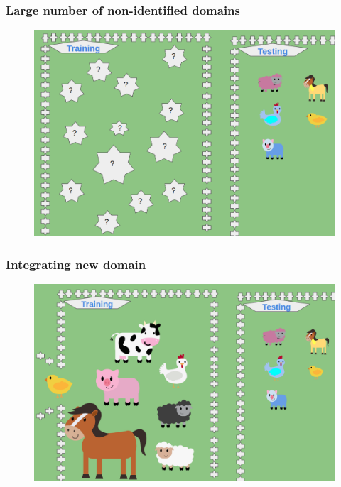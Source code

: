 \documentclass{beamer}
\begin{document}
\begin{frame}
\frametitle{Large number of non-identified domains}
\begin{figure}
\includegraphics[width=\textwidth]{cluster_question.png}
\end{figure}
\end{frame}

\begin{frame}
\frametitle{Integrating new domain}
\begin{figure}
\includegraphics[width=\textwidth]{new_question.png}
\end{figure}
\end{frame}
\end{document}
